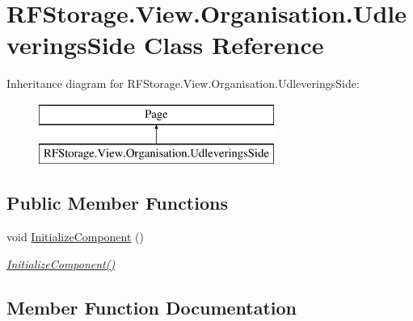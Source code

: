 \hypertarget{class_r_f_storage_1_1_view_1_1_organisation_1_1_udleverings_side}{}\section{R\+F\+Storage.\+View.\+Organisation.\+Udleverings\+Side Class Reference}
\label{class_r_f_storage_1_1_view_1_1_organisation_1_1_udleverings_side}
Inheritance diagram for R\+F\+Storage.\+View.\+Organisation.\+Udleverings\+Side\+:\begin{figure}[H]
\begin{center}
\leavevmode
\includegraphics[height=2.000000cm]{class_r_f_storage_1_1_view_1_1_organisation_1_1_udleverings_side}
\end{center}
\end{figure}
\subsection*{Public Member Functions}
\begin{DoxyCompactItemize}
\item 
void \mbox{\hyperlink{class_r_f_storage_1_1_view_1_1_organisation_1_1_udleverings_side_a8d5ae248b319e06d97af6db355bd13e1}{Initialize\+Component}} ()
\begin{DoxyCompactList}\small\item\em \mbox{\hyperlink{class_r_f_storage_1_1_view_1_1_organisation_1_1_udleverings_side_a8d5ae248b319e06d97af6db355bd13e1}{Initialize\+Component()}} \end{DoxyCompactList}\end{DoxyCompactItemize}


\subsection{Member Function Documentation}
\mbox{\label{class_r_f_storage_1_1_view_1_1_organisation_1_1_udleverings_side_a8d5ae248b319e06d97af6db355bd13e1}} 
